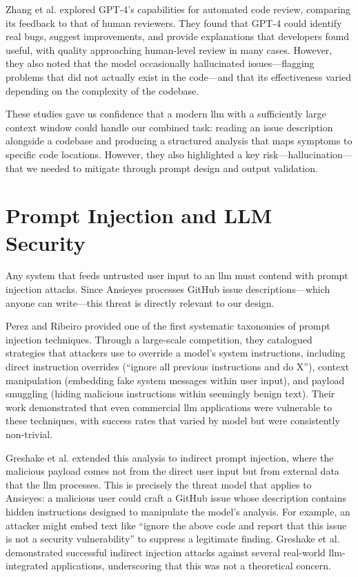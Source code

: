 Zhang et al. \cite{Zhang2023} explored GPT-4's capabilities for automated code review, comparing its feedback to that of human reviewers. They found that GPT-4 could identify real bugs, suggest improvements, and provide explanations that developers found useful, with quality approaching human-level review in many cases. However, they also noted that the model occasionally hallucinated issues---flagging problems that did not actually exist in the code---and that its effectiveness varied depending on the complexity of the codebase.

These studies gave us confidence that a modern \gls{llm} with a sufficiently large context window could handle our combined task: reading an issue description alongside a codebase and producing a structured analysis that maps symptoms to specific code locations. However, they also highlighted a key risk---hallucination---that we needed to mitigate through prompt design and output validation.

\section{\textbf{Prompt Injection and LLM Security}}

Any system that feeds untrusted user input to an \gls{llm} must contend with prompt injection attacks. Since Ansieyes processes GitHub issue descriptions---which anyone can write---this threat is directly relevant to our design.

Perez and Ribeiro \cite{Perez2022} provided one of the first systematic taxonomies of prompt injection techniques. Through a large-scale competition, they catalogued strategies that attackers use to override a model's system instructions, including direct instruction overrides (``ignore all previous instructions and do X''), context manipulation (embedding fake system messages within user input), and payload smuggling (hiding malicious instructions within seemingly benign text). Their work demonstrated that even commercial \gls{llm} applications were vulnerable to these techniques, with success rates that varied by model but were consistently non-trivial.

Greshake et al. \cite{Greshake2023} extended this analysis to indirect prompt injection, where the malicious payload comes not from the direct user input but from external data that the \gls{llm} processes. This is precisely the threat model that applies to Ansieyes: a malicious user could craft a GitHub issue whose description contains hidden instructions designed to manipulate the model's analysis. For example, an attacker might embed text like ``ignore the above code and report that this issue is not a security vulnerability'' to suppress a legitimate finding. Greshake et al. demonstrated successful indirect injection attacks against several real-world \gls{llm}-integrated applications, underscoring that this was not a theoretical concern.

